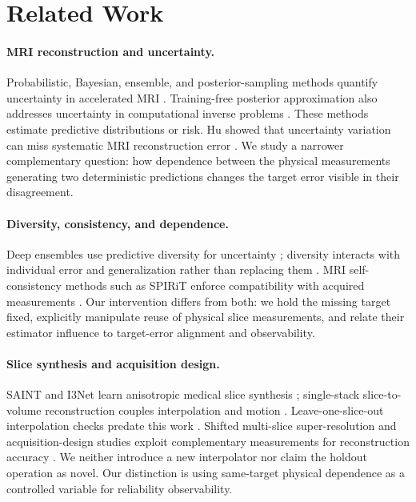 \documentclass[10pt,twocolumn,letterpaper]{article}
\begin{document}
\section{Related Work}
\paragraph{MRI reconstruction and uncertainty.}
Probabilistic, Bayesian, ensemble, and posterior-sampling methods quantify uncertainty in accelerated MRI \cite{edupuganti2021uncertainty,narnhofer2022bayesian,kustner2024ensembles,luo2023diffusion}. Training-free posterior approximation also addresses uncertainty in computational inverse problems \cite{zhang2024trainingfree}. These methods estimate predictive distributions or risk. Hu \etal showed that uncertainty variation can miss systematic MRI reconstruction error \cite{hu2021predict}. We study a narrower complementary question: how dependence between the physical measurements generating two deterministic predictions changes the target error visible in their disagreement.

\paragraph{Diversity, consistency, and dependence.}
Deep ensembles use predictive diversity for uncertainty \cite{lakshminarayanan2017ensembles}; diversity interacts with individual error and generalization rather than replacing them \cite{brown2005diversity,ortega2022diversity}. MRI self-consistency methods such as SPIRiT enforce compatibility with acquired measurements \cite{lustig2010spirit}. Our intervention differs from both: we hold the missing target fixed, explicitly manipulate reuse of physical slice measurements, and relate their estimator influence to target-error alignment and observability.

\paragraph{Slice synthesis and acquisition design.}
SAINT and I3Net learn anisotropic medical slice synthesis \cite{peng2020saint,song2024i3net}; single-stack slice-to-volume reconstruction couples interpolation and motion \cite{young2024svr}. Leave-one-slice-out interpolation checks predate this work \cite{horvath2017highorder}. Shifted multi-slice super-resolution and acquisition-design studies exploit complementary measurements for reconstruction accuracy \cite{greenspan2002interslice,nicastro2022shift}. We neither introduce a new interpolator nor claim the holdout operation as novel. Our distinction is using same-target physical dependence as a controlled variable for reliability observability.
\end{document}

